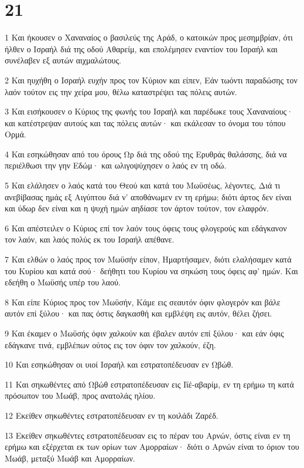\chapter{21}

\par 1 Και ήκουσεν ο Χαναναίος ο βασιλεύς της Αράδ, ο κατοικών προς μεσημβρίαν, ότι ήλθεν ο Ισραήλ διά της οδού Αθαρείμ, και επολέμησεν εναντίον του Ισραήλ και συνέλαβεν εξ αυτών αιχμαλώτους.
\par 2 Και ηυχήθη ο Ισραήλ ευχήν προς τον Κύριον και είπεν, Εάν τωόντι παραδώσης τον λαόν τούτον εις την χείρα μου, θέλω καταστρέψει τας πόλεις αυτών.
\par 3 Και εισήκουσεν ο Κύριος της φωνής του Ισραήλ και παρέδωκε τους Χαναναίους· και κατέστρεψαν αυτούς και τας πόλεις αυτών· και εκάλεσαν το όνομα του τόπου Ορμά.
\par 4 Και εσηκώθησαν από του όρους Ωρ διά της οδού της Ερυθράς θαλάσσης, διά να περιέλθωσι την γην Εδώμ· και ωλιγοψύχησεν ο λαός εν τη οδώ.
\par 5 Και ελάλησεν ο λαός κατά του Θεού και κατά του Μωϋσέως, λέγοντες, Διά τι ανεβίβασας ημάς εξ Αιγύπτου διά ν' αποθάνωμεν εν τη ερήμω; διότι άρτος δεν είναι και ύδωρ δεν είναι και η ψυχή ημών αηδίασε τον άρτον τούτον, τον ελαφρόν.
\par 6 Και απέστειλεν ο Κύριος επί τον λαόν τους όφεις τους φλογερούς και εδάγκανον τον λαόν, και λαός πολύς εκ του Ισραήλ απέθανε.
\par 7 Και ελθών ο λαός προς τον Μωϋσήν είπον, Ημαρτήσαμεν, διότι ελαλήσαμεν κατά του Κυρίου και κατά σού· δεήθητι του Κυρίου να σηκώση τους όφεις αφ' ημών. Και εδεήθη ο Μωϋσής υπέρ του λαού.
\par 8 Και είπε Κύριος προς τον Μωϋσήν, Κάμε εις σεαυτόν όφιν φλογερόν και βάλε αυτόν επί ξύλου· και πας όστις δαγκασθή και εμβλέψη εις αυτόν, θέλει ζήσει.
\par 9 Και έκαμεν ο Μωϋσής όφιν χαλκούν και έβαλεν αυτόν επί ξύλου· και εάν όφις εδάγκανε τινά, εμβλέπων ούτος εις τον όφιν τον χαλκούν, έζη.
\par 10 Και εσηκώθησαν οι υιοί Ισραήλ και εστρατοπέδευσαν εν Ωβώθ.
\par 11 Και σηκωθέντες από Ωβώθ εστρατοπέδευσαν εις Ιϊέ-αβαρίμ, εν τη ερήμω τη κατά πρόσωπον του Μωάβ, προς ανατολάς ηλίου.
\par 12 Εκείθεν σηκωθέντες εστρατοπέδευσαν εν τη κοιλάδι Ζαρέδ.
\par 13 Εκείθεν σηκωθέντες εστρατοπέδευσαν εις το πέραν του Αρνών, όστις είναι εν τη ερήμω και εξέρχεται εκ των ορίων των Αμορραίων· διότι ο Αρνών είναι το όριον του Μωάβ, μεταξύ Μωάβ και Αμορραίων.
